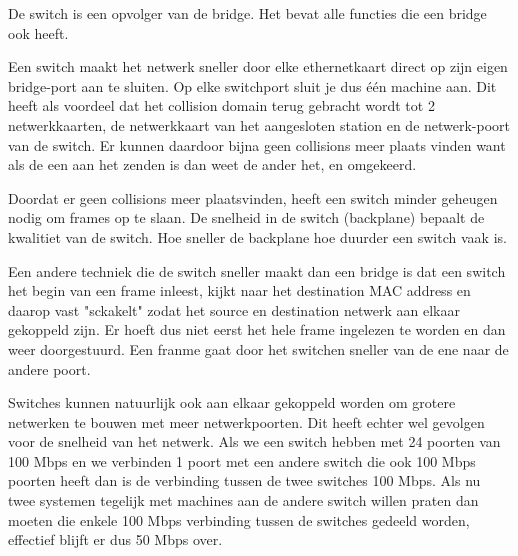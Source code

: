 De switch is een opvolger van de bridge. Het bevat alle functies die een bridge ook heeft.

Een switch maakt het netwerk sneller door elke ethernetkaart direct op zijn eigen bridge-port aan te sluiten. Op elke switchport sluit je dus \'e\'en machine aan. Dit heeft als voordeel dat het collision domain terug gebracht wordt tot 2 netwerkkaarten, de netwerkkaart van het aangesloten station en de netwerk-poort van de switch. Er kunnen daardoor bijna geen collisions meer plaats vinden want als de een aan het zenden is dan weet de ander het, en omgekeerd.

Doordat er geen collisions meer plaatsvinden, heeft een switch minder geheugen nodig om frames op te slaan. De snelheid in de switch (backplane) bepaalt de kwalitiet van de switch. Hoe sneller de backplane hoe duurder een switch vaak is.

Een andere techniek die de switch sneller maakt dan een bridge is dat een switch het begin van een frame inleest, kijkt naar het destination MAC address en daarop vast "sckakelt" zodat het source en destination netwerk aan elkaar gekoppeld zijn. Er hoeft dus niet eerst het hele frame ingelezen te worden en dan weer doorgestuurd. Een franme gaat door het switchen sneller van de ene naar de andere poort.

Switches kunnen natuurlijk ook aan elkaar gekoppeld worden om grotere netwerken te bouwen met meer netwerkpoorten. Dit heeft echter wel gevolgen voor de snelheid van het netwerk. Als we een switch hebben met 24 poorten van 100 Mbps en we verbinden 1 poort met een andere switch die ook 100 Mbps poorten heeft dan is de verbinding tussen de twee switches 100 Mbps. Als nu twee systemen tegelijk met machines aan de andere switch willen praten dan moeten die enkele 100 Mbps verbinding tussen de switches gedeeld worden, effectief blijft er dus 50 Mbps over.
